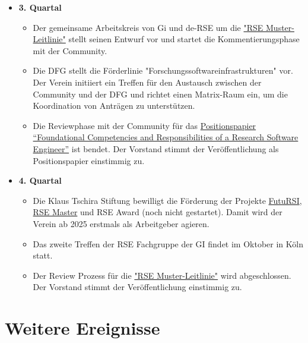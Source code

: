 \begin{itemize}
\begin{itemize}
    
   \end{itemize}
 \item[] \textbf{3. Quartal}
   \begin{itemize}

    \item Der gemeinsame Arbeitskreis von Gi und de-RSE um die \href{https://doi.org/10.18420/2025-gi_de-rse}{"RSE Muster-Leitlinie"} stellt seinen Entwurf vor und startet die Kommentierungsphase mit der Community.
    \item Die DFG stellt die Förderlinie "Forschungssoftwareinfrastrukturen" vor. Der Verein initiiert ein Treffen für den Austausch zwischen der Community und der DFG und richtet einen Matrix-Raum ein, um die Koordination von Anträgen zu unterstützen.
    \item Die Reviewphase mit der Community für das  \href{https://doi.org/10.12688/f1000research.157778.2}{Positionspapier “Foundational Competencies and Responsibilities of a Research Software Engineer”} ist bendet. Der Vorstand stimmt der Veröffentlichung als Positionspapier einstimmig zu.

   \end{itemize}
 \item[] \textbf{4. Quartal}
   \begin{itemize}
    \item Die Klaus Tschira Stiftung bewilligt die Förderung der Projekte \href{https://www.futursi.de/}{FutuRSI}, \href{https://the-teachingrse-project.github.io/RSE-Masters/}{RSE Master} und RSE Award (noch nicht gestartet).
    Damit wird der Verein ab 2025 erstmals als Arbeitgeber agieren.
    \item Das zweite Treffen der RSE Fachgruppe der GI findet im Oktober in Köln statt.
    \item Der Review Prozess für die \href{https://doi.org/10.18420/2025-gi_de-rse}{"RSE Muster-Leitlinie"} wird abgeschlossen. Der Vorstand stimmt der Veröffentlichung einstimmig zu.
   \end{itemize}
\end{itemize}
\clearpage
\section{Weitere Ereignisse}

